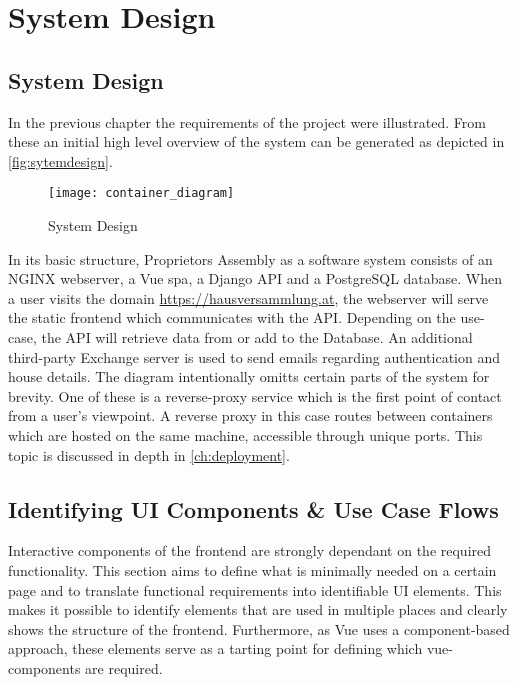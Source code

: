 \chapter[System Design]{System Design}

\section{System Design}
In the previous chapter the requirements of the project were illustrated. From these an initial high level overview of the system can be generated as depicted in \autoref{fig:sytemdesign}.

\begin{figure}[H]
    \begin{center}
    \texttt{[image: container\_diagram]}
    \end{center}
    \caption{System Design}
    \label{fig:sytemdesign}
\end{figure}

In its basic structure, Proprietors Assembly as a software system consists of an NGINX webserver, a Vue \acrlong{spa}, a Django API and a PostgreSQL database. When a user visits the domain \url{https://hausversammlung.at}, the webserver will serve the static frontend which communicates with the API. Depending on the use-case, the API will retrieve data from or add to the Database. An additional third-party Exchange server is used to send emails regarding authentication and house details. The diagram intentionally omitts certain parts of the system for brevity. One of these is a reverse-proxy service which is the first point of contact from a user's viewpoint. A reverse proxy in this case routes between containers which are hosted on the same machine, accessible through unique ports. This topic is discussed in depth in \autoref{ch:deployment}.

\section{Identifying UI Components \& Use Case Flows} \label{sec:uicomponents_flows}
Interactive components of the frontend are strongly dependant on the required functionality. This section aims to define what is minimally needed on a certain page and to translate functional requirements into identifiable UI elements. This makes it possible to identify elements that are used in multiple places and clearly shows the structure of the frontend. Furthermore, as Vue uses a component-based approach, these elements serve as a tarting point for defining which vue-components are required.

